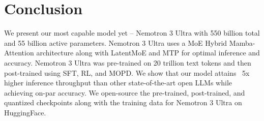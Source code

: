 \section{Conclusion}
\label{sec:conclusion}
We present our most capable model yet – Nemotron 3 Ultra with 550 billion total and 55 billion active parameters. Nemotron 3 Ultra uses a MoE Hybrid Mamba-Attention architecture along with LatentMoE and MTP for optimal inference and accuracy. Nemotron 3 Ultra was pre-trained on 20 trillion text tokens and then post-trained using SFT, RL, and MOPD. We show that our model attains ~5x higher inference throughput than other state-of-the-art open LLMs while achieving on-par accuracy. We open-source the pre-trained, post-trained, and quantized checkpoints along with the training data for Nemotron 3 Ultra on HuggingFace.
